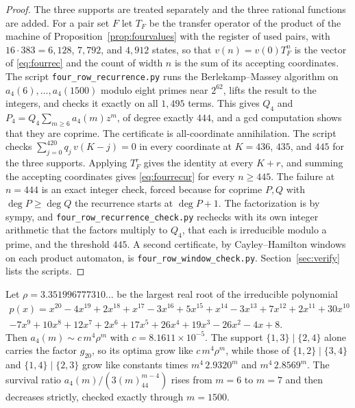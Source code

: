 \begin{proof}
The three supports are treated separately and the three rational functions are added. For a pair set $F$ let $T_F$ be the transfer operator of the product of the machine of Proposition~\ref{prop:fourvalues} with the register of used pairs, with $16\cdot383=6{,}128$, $7{,}792$, and $4{,}912$ states, so that $v(n)=v(0)T_F^n$ is the vector of \eqref{eq:fourrec} and the count of width $n$ is the sum of its accepting coordinates. The script \texttt{four\_row\_recurrence.py} runs the Berlekamp--Massey algorithm on $a_4(6),\ldots,a_4(1500)$ modulo eight primes near $2^{62}$, lifts the result to the integers, and checks it exactly on all $1{,}495$ terms. This gives $Q_4$ and $P_4=Q_4\sum_{m\ge6}a_4(m)z^m$, of degree exactly $444$, and a gcd computation shows that they are coprime. The certificate is all-coordinate annihilation. The script checks $\sum_{j=0}^{420}q_j\,v(K-j)=0$ in every coordinate at $K=436$, $435$, and $445$ for the three supports. Applying $T_F^r$ gives the identity at every $K+r$, and summing the accepting coordinates gives \eqref{eq:fourrecur} for every $n\ge445$. The failure at $n=444$ is an exact integer check, forced because for coprime $P,Q$ with $\deg P\ge\deg Q$ the recurrence starts at $\deg P+1$. The factorization is by sympy, and \texttt{four\_row\_recurrence\_check.py} rechecks with its own integer arithmetic that the factors multiply to $Q_4$, that each is irreducible modulo a prime, and the threshold $445$. A second certificate, by Cayley--Hamilton windows on each product automaton, is \texttt{four\_row\_window\_check.py}. Section~\ref{sec:verify} lists the scripts.
\end{proof}

\begin{corollary}\label{cor:fourgrowth}
Let $\rho=3.351996777310\ldots$ be the largest real root of the irreducible polynomial
\begin{multline*}
p(x)=x^{20}-4x^{19}+2x^{18}+x^{17}-3x^{16}+5x^{15}+x^{14}-3x^{13}+7x^{12}+2x^{11}+30x^{10}\\
-7x^{9}+10x^{8}+12x^{7}+2x^{6}+17x^{5}+26x^{4}+19x^{3}-26x^{2}-4x+8 .
\end{multline*}
Then $a_4(m)\sim c\,m^4\rho^m$ with $c=8.1611\times10^{-5}$. The support $\{1,3\}\mid\{2,4\}$ alone carries the factor $g_{20}$, so its optima grow like $c\,m^4\rho^m$, while those of $\{1,2\}\mid\{3,4\}$ and $\{1,4\}\mid\{2,3\}$ grow like constants times $m^4\,2.9320^m$ and $m^4\,2.8569^m$. The survival ratio $a_4(m)/(3(m)_44^{m-4})$ rises from $m=6$ to $m=7$ and then decreases strictly, checked exactly through $m=1500$.
\end{corollary}

